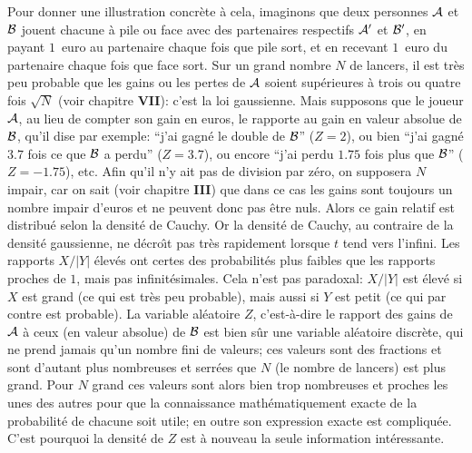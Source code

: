 Pour donner une illustration concr\`ete \`a cela, imaginons que deux 
personnes ${\cal A}$ et ${\cal B}$ jouent chacune \`a pile ou face avec 
des partenaires respectifs ${\cal A}'$ et ${\cal B}'$,  en payant $1\,$  
euro au partenaire chaque fois que pile sort,  et en recevant $1\,$  
euro du partenaire chaque fois que face sort.  Sur un grand nombre 
$N$ de lancers,  il est tr\`es peu probable que les gains ou les pertes 
de ${\cal A}$ soient sup\'erieures \`a trois ou quatre fois $\sqrt{N}$  
(voir chapitre {\bf VII}):  c'est la loi gaussienne.  Mais supposons 
que le joueur ${\cal A}$,  au lieu de compter son gain en euros,  le rapporte 
au gain en valeur absolue de ${\cal B}$,  qu'il dise par exemple:  ``j'ai 
gagn\'e le double de ${\cal B}$'' ($Z = 2$),  ou bien ``j'ai gagn\'e $3.7$  
fois ce que ${\cal B}$ a perdu'' ($Z = 3.7$),  ou encore ``j'ai perdu $1.75$ 
fois plus que ${\cal B}$'' ($Z = -1.75$),  etc.  Afin qu'il n'y ait pas de 
division par z\'ero,  on supposera $N$ impair,  car on sait (voir chapitre  
{\bf III}) que dans ce cas les gains sont toujours un nombre impair
d'euros et ne peuvent donc pas \^etre nuls.  Alors ce gain relatif est 
distribu\'e selon la densit\'e de Cauchy.  Or la densit\'e de Cauchy, 
au contraire de la densit\'e gaussienne,  ne d\'ecro{\^\i}t pas tr\`es 
rapidement lorsque $t$ tend vers l'infini.  Les rapports $X / |Y|$ \'elev\'es 
ont certes des probabilit\'es plus faibles que les rapports proches de  
$1$,  mais pas infinit\'esimales.  Cela n'est pas paradoxal:  $X / |Y|$ est 
\'elev\'e si $X$ est grand (ce qui est  tr\`es peu probable),  mais aussi si 
$Y$ est petit (ce qui par contre est probable). 
\medskip 
La variable al\'eatoire $Z$,  c'est-\`a-dire le rapport des gains de  
${\cal A}$ \`a ceux (en valeur absolue) de ${\cal B}$ est bien s\^ur une 
variable al\'eatoire discr\`ete,  qui ne prend jamais qu'un nombre fini de 
valeurs;  ces valeurs sont des fractions et sont d'autant plus nombreuses 
et serr\'ees que $N$ (le nombre de lancers) est plus grand.  Pour $N$  
grand ces valeurs sont alors bien trop nombreuses et proches les unes  
des autres pour que la connaissance math\'ematiquement exacte de la 
probabilit\'e de chacune soit utile;  en outre son expression exacte est 
compliqu\'ee.  C'est pourquoi la densit\'e de $Z$ est \`a nouveau la seule 
information int\'eressante.  
 
\bigskip 
 
